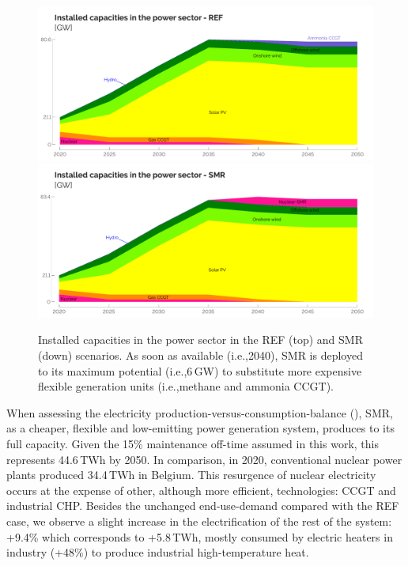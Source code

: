 \documentclass[11pt,twoside,a4paper,english]{article}
\def\ie{i.e.,}
\begin{document}
\begin{figure}[t!]
\centering
\includegraphics[width=\textwidth]{Elec_Tech_Cap_REF.pdf}
\includegraphics[width=\textwidth]{Elec_Tech_Cap_SMR.pdf}
\caption{Installed capacities in the power sector in the REF (top) and SMR (down) scenarios. As soon as available (\ie 2040), \acrfull{SMR} is deployed to its maximum potential (\ie 6\,GW) to substitute more expensive flexible generation units (\ie methane and ammonia \gls{CCGT}).}
\label{fig:results_deter_tech_cap_elec}
\end{figure}

When assessing the electricity production-versus-consumption-balance (), \gls{SMR}, as a cheaper, flexible and low-emitting power generation system, produces to its full capacity. Given the 15\% maintenance off-time assumed in this work, this represents 44.6\,TWh by 2050. In comparison, in 2020, conventional nuclear power plants produced 34.4\,TWh in Belgium. This resurgence of nuclear electricity occurs at the expense of other, although more efficient, technologies: \gls{CCGT} and industrial \gls{CHP}. Besides the unchanged end-use-demand compared with the REF case, we observe a slight increase in the electrification of the rest of the system: +9.4\% which corresponds to +5.8\,TWh, mostly consumed by electric heaters in industry (+48\%) to produce industrial high-temperature heat.
\end{document}
